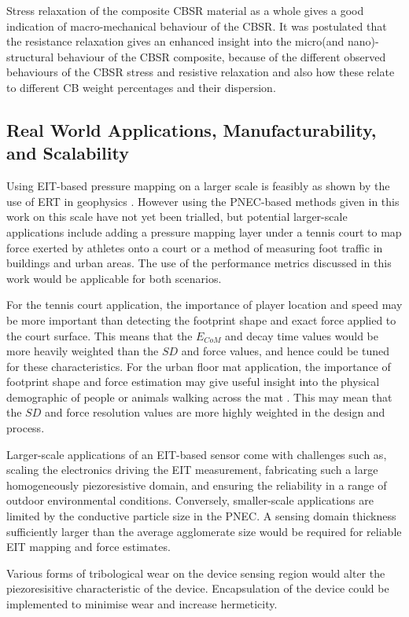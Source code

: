 Stress relaxation of the composite CBSR material as a whole gives a good indication of macro-mechanical behaviour of the CBSR. It was postulated that the resistance relaxation gives an enhanced insight into the micro(and nano)-structural behaviour of the CBSR composite, because of the different observed behaviours of the CBSR stress and resistive relaxation and also how these relate to different CB weight percentages and their dispersion.


\subsection{Real World Applications, Manufacturability, and Scalability}
Using EIT-based pressure mapping on a larger scale is feasibly as shown by the use of ERT in geophysics \citep{Griffiths1993}. However using the PNEC-based methods given in this work on this scale have not yet been trialled, but potential larger-scale applications include adding a pressure mapping layer under a tennis court to map force exerted by athletes onto a court or a method of measuring foot traffic in buildings and urban areas. The use of the performance metrics discussed in this work would be applicable for both scenarios. 

For the tennis court application, the importance of player location and speed may be more important than detecting the footprint shape and exact force applied to the court surface. This means that the $E_{CoM}$ and decay time values would be more heavily weighted than the $S\!D$ and force values, and hence could be tuned for these characteristics. For the urban floor mat application, the importance of footprint shape and force estimation may give useful insight into the physical demographic of people or animals walking across the mat \cite{Yuan2023}. This may mean that the $S\!D$ and force resolution values are more highly weighted in the design and process.

Larger-scale applications of an EIT-based sensor come with challenges such as, scaling the electronics driving the EIT measurement, fabricating such a large homogeneously piezoresistive domain, and ensuring the reliability in a range of outdoor environmental conditions. Conversely, smaller-scale applications are limited by the conductive particle size in the PNEC. A sensing domain thickness sufficiently larger than the average agglomerate size would be required for reliable EIT mapping and force estimates.

Various forms of tribological wear on the device sensing region would alter the piezoresisitive characteristic of the device. Encapsulation of the device could be implemented to minimise wear and increase hermeticity.

